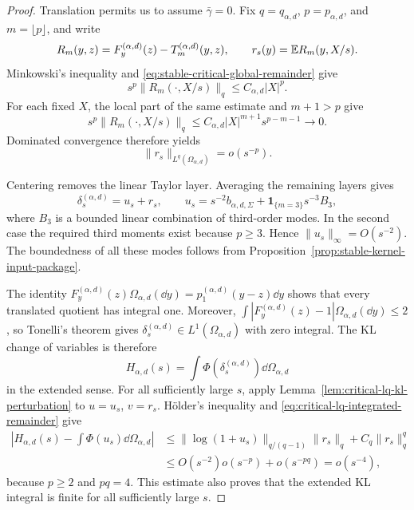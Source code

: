 \begin{proof}
Translation permits us to assume \(\bar\gamma=0\).  Fix
\(q=q_{\alpha,d}\), \(p=p_{\alpha,d}\), and \(m=\lfloor p\rfloor\),
and write
\[
 R_m(y,z)=F_y^{(\alpha,d)}(z)-T_m^{(\alpha,d)}(y,z),
 \qquad r_s(y)=\mathbb{E} R_m(y,X/s).
\]
Minkowski's inequality and
\eqref{eq:stable-critical-global-remainder} give
\[
 s^p\|R_m(\cdot,X/s)\|_q\le C_{\alpha,d}|X|^p.
\]
For each fixed \(X\), the local part of the same estimate and \(m+1>p\)
give
\[
 s^p\|R_m(\cdot,X/s)\|_q
 \le C_{\alpha,d}|X|^{m+1}s^{p-m-1}\longrightarrow0.
\]
Dominated convergence therefore yields
\begin{equation}\label{eq:critical-lq-integrated-remainder}
 \|r_s\|_{L^q(\Omega_{\alpha,d})}=o(s^{-p}).
\end{equation}

Centering removes the linear Taylor layer.  Averaging the remaining layers
gives
\begin{equation}\label{eq:critical-kl-quotient-decomposition}
 \delta_s^{(\alpha,d)}=u_s+r_s,
 \qquad
 u_s=s^{-2}b_{\alpha,d,\Sigma}
       +\mathbf 1_{\{m=3\}}s^{-3}B_3,
\end{equation}
where \(B_3\) is a bounded linear combination of third-order modes.  In the
second case the required third moments exist because \(p\ge3\).  Hence
\(\|u_s\|_\infty=O(s^{-2})\).  The boundedness of all these modes follows
from Proposition~\ref{prop:stable-kernel-input-package}.

The identity
\(F_y^{(\alpha,d)}(z)\Omega_{\alpha,d}(\dd y)
=p_1^{(\alpha,d)}(y-z)\dd y\) shows that every translated quotient has
integral one.  Moreover,
\(\int|F_y^{(\alpha,d)}(z)-1|\Omega_{\alpha,d}(\dd y)\le2\), so Tonelli's
theorem gives \(\delta_s^{(\alpha,d)}\in L^1(\Omega_{\alpha,d})\) with
zero integral.  The KL change of variables is therefore
\[
 H_{\alpha,d}(s)=\int\Phi(\delta_s^{(\alpha,d)})\dd\Omega_{\alpha,d}
\]
in the extended sense.  For all sufficiently large \(s\), apply
Lemma~\ref{lem:critical-lq-kl-perturbation} to \(u=u_s\), \(v=r_s\).
Hölder's inequality and \eqref{eq:critical-lq-integrated-remainder} give
\begin{align*}
 \left|H_{\alpha,d}(s)-\int\Phi(u_s)\dd\Omega_{\alpha,d}\right|
 &\le \|\log(1+u_s)\|_{q/(q-1)}\|r_s\|_q
       +C_q\|r_s\|_q^q\\
 &\le O(s^{-2})o(s^{-p})+o(s^{-pq})=o(s^{-4}),
\end{align*}
because \(p\ge2\) and \(pq=4\).
This estimate also proves that the extended KL integral is finite for all
sufficiently large \(s\).


\end{proof}
